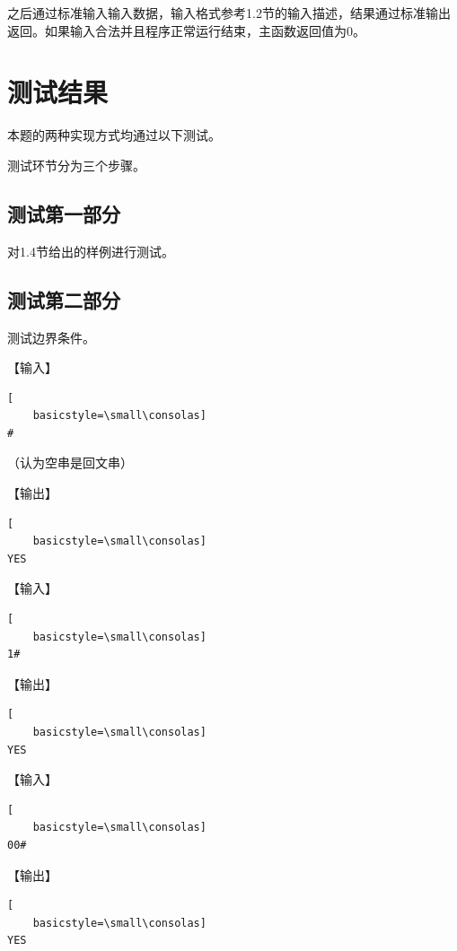 \documentclass{article}
\begin{document}
之后通过标准输入输入数据，输入格式参考1.2节的输入描述，结果通过标准输出返回。如果输入合法并且程序正常运行结束，主函数返回值为0。

\section{测试结果}

本题的两种实现方式均通过以下测试。

测试环节分为三个步骤。

\subsection{测试第一部分}

对1.4节给出的样例进行测试。

\subsection{测试第二部分}

测试边界条件。

【输入】

\begin{lstlisting}[
    basicstyle=\small\consolas]
#
\end{lstlisting}

（认为空串是回文串）

【输出】

\begin{lstlisting}[
    basicstyle=\small\consolas]
YES
\end{lstlisting}

【输入】

\begin{lstlisting}[
    basicstyle=\small\consolas]
1#
\end{lstlisting}

【输出】

\begin{lstlisting}[
    basicstyle=\small\consolas]
YES
\end{lstlisting}

【输入】

\begin{lstlisting}[
    basicstyle=\small\consolas]
00#
\end{lstlisting}

【输出】

\begin{lstlisting}[
    basicstyle=\small\consolas]
YES
\end{lstlisting}
\end{document}
